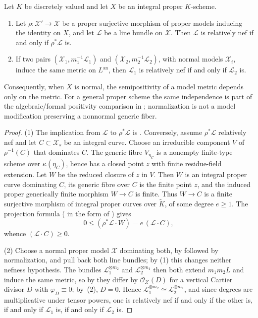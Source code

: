 \begin{lemma}
\label{lem:metrics-nef-independence}
Let $K$ be discretely valued and let $X$ be an integral proper
$K$-scheme.
\begin{enumerate}
\item Let $\rho:\mathcal X'\to\mathcal X$ be a proper surjective morphism
of proper models inducing the identity on $X$, and let
$\mathcal L$ be a line bundle on $\mathcal X$. Then $\mathcal L$ is
relatively nef if and only if $\rho^*\mathcal L$ is.
\item If two pairs $(\mathcal X_1,m_1^{-1}\mathcal L_1)$ and
$(\mathcal X_2,m_2^{-1}\mathcal L_2)$, with normal models
$\mathcal X_i$, induce the same metric on $L^{\mathrm{an}}$, then
$\mathcal L_1$ is relatively nef if and only if $\mathcal L_2$ is.
\end{enumerate}
Consequently, when $X$ is normal, the semipositivity of a model metric
depends only on the metric. For a general proper scheme the same
independence is part of the algebraic/formal positivity comparison in
\cite[Theorem~1.1]{GM19}; normalization is not a model modification
preserving a nonnormal generic fiber.
\end{lemma}

\begin{proof}
(1) The implication from $\mathcal L$ to $\rho^*\mathcal L$ is
. Conversely, assume $\rho^*\mathcal L$
relatively nef and let $C\subset\mathcal X_s$ be an integral curve. Choose
an irreducible component $V$ of $\rho^{-1}(C)$ that dominates $C$.
The generic fibre $V_{\eta_C}$ is a nonempty finite-type scheme over
$\kappa(\eta_C)$, hence has a closed point $z$ with finite residue-field
extension. Let $W$ be the reduced closure of $z$ in $V$. Then $W$ is an
integral proper curve dominating $C$, its generic fibre over $C$ is the
finite point $z$, and the induced proper generically finite morphism
$W\to C$ is finite. Thus $W\to C$ is a finite surjective morphism of
integral proper curves over $\widetilde K$, of some degree $e\ge1$.
The projection formula
( in the form of
\cite[Proposition~2.5(c)]{Ful}) gives
\[
 0\le(\rho^*\mathcal L\cdot W)=e\,(\mathcal L\cdot C),
\]
whence $(\mathcal L\cdot C)\ge0$.

(2) Choose a normal proper model $\mathcal X$ dominating both, by
 followed by normalization, and pull back both
line bundles; by (1) this changes neither nefness hypothesis. The bundles
$\mathcal L_1^{\otimes m_2}$ and $\mathcal L_2^{\otimes m_1}$ then both
extend $m_1m_2L$ and induce the same metric, so by
 they differ by
$\mathcal O_{\mathcal X}(D)$ for a vertical Cartier divisor $D$ with
$\varphi_D\equiv0$; by
\,(2), $D=0$. Hence
$\mathcal L_1^{\otimes m_2}\simeq\mathcal L_2^{\otimes m_1}$, and since
degrees are multiplicative under tensor powers, one is relatively nef if and
only if the other is, if and only if $\mathcal L_1$ is, if and only if
$\mathcal L_2$ is.
\end{proof}

